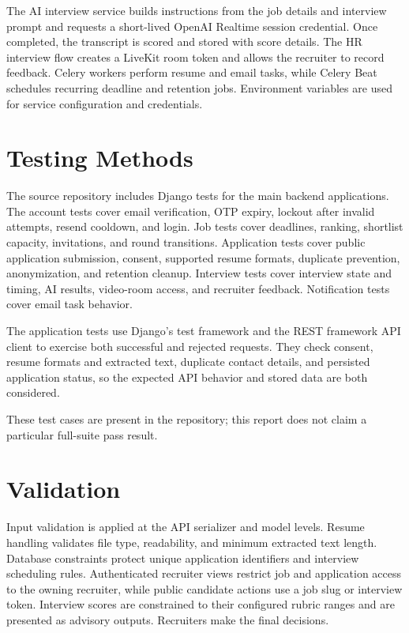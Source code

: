The AI interview service builds instructions from the job details and interview prompt and requests a short-lived OpenAI Realtime session credential. Once completed, the transcript is scored and stored with score details. The HR interview flow creates a LiveKit room token and allows the recruiter to record feedback. Celery workers perform resume and email tasks, while Celery Beat schedules recurring deadline and retention jobs. Environment variables are used for service configuration and credentials.
%
\section{Testing Methods}
The source repository includes Django tests for the main backend applications. The account tests cover email verification, OTP expiry, lockout after invalid attempts, resend cooldown, and login. Job tests cover deadlines, ranking, shortlist capacity, invitations, and round transitions. Application tests cover public application submission, consent, supported resume formats, duplicate prevention, anonymization, and retention cleanup. Interview tests cover interview state and timing, AI results, video-room access, and recruiter feedback. Notification tests cover email task behavior.

The application tests use Django's test framework and the REST framework API client to exercise both successful and rejected requests. They check consent, resume formats and extracted text, duplicate contact details, and persisted application status, so the expected API behavior and stored data are both considered.

These test cases are present in the repository; this report does not claim a particular full-suite pass result.
\section{Validation}
Input validation is applied at the API serializer and model levels. Resume handling validates file type, readability, and minimum extracted text length. Database constraints protect unique application identifiers and interview scheduling rules. Authenticated recruiter views restrict job and application access to the owning recruiter, while public candidate actions use a job slug or interview token. Interview scores are constrained to their configured rubric ranges and are presented as advisory outputs. Recruiters make the final decisions.
%
%
